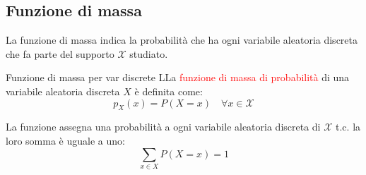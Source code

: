\documentclass{article}  %
\theoremstyle{definition}
\begin{document}
\subsection{Funzione di massa}
La funzione di massa indica la probabilità che ha ogni variabile aleatoria discreta che fa parte del supporto $\mathscr{X}$ studiato.
\begin{theorem}{Funzione di massa per var discrete}
	LLa \textcolor{red}{funzione di massa di probabilità} di una variabile aleatoria discreta $X$ è definita come:
	\[
		p_{X}(x)=P(X=x) \quad \forall{x \in \mathscr{X}}
	\]
\end{theorem}
\begin{osservazioni}[Osservazione:]
	La funzione assegna una probabilità a ogni variabile aleatoria discreta di $\mathscr{X}$ t.c. la loro somma è uguale a uno:
	\[
		\sum_{x \in X} P(X = x) = 1
	\]
\end{osservazioni}
\end{document}
